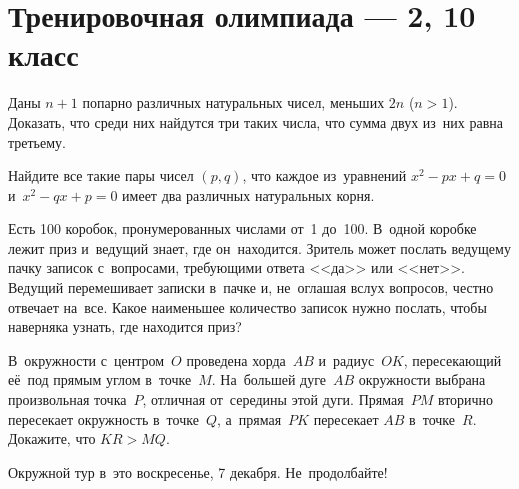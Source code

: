 
\section*{Тренировочная олимпиада --- 2, 10 класс}


\begin{problems}

\item
Даны $n + 1$ попарно различных натуральных чисел, меньших $2 n$ ($n > 1$).
Доказать, что среди них найдутся три таких числа, что сумма двух из~них равна
третьему.

\item
Найдите все такие пары чисел $(p, q)$, что каждое из~уравнений
$x^2 - px + q = 0$  и~$x^2 - qx + p = 0$ имеет два различных натуральных корня.

\item
Есть 100 коробок, пронумерованных числами от~1 до~100.
В~одной коробке лежит приз и~ведущий знает, где он~находится.
Зритель может послать ведущему пачку записок с~вопросами, требующими ответа
<<да>> или <<нет>>.
Ведущий перемешивает записки в~пачке и, не~оглашая вслух вопросов, честно
отвечает на~все.
Какое наименьшее количество записок нужно послать, чтобы наверняка узнать,
где находится приз?

\item
В~окружности с~центром~$O$ проведена хорда~$AB$ и~радиус~$OK$, пересекающий
её~под прямым углом в~точке~$M$.
На~большей дуге~$AB$ окружности выбрана произвольная точка~$P$, отличная
от~середины этой дуги.
Прямая~$PM$ вторично пересекает окружность в~точке~$Q$, а~прямая~$PK$
пересекает $AB$ в~точке~$R$.
Докажите, что $KR > MQ$.

\end{problems}

\begin{center}\small\sffamily
Окружной тур в~это воскресенье, 7 декабря.
Не~продолбайте!
\end{center}

